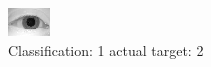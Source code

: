 \begin{figure}[h!]
\begin{center}
\includegraphics[width=0.60\columnwidth]{figures/ID860_class_1_target_2.png}
\end{center}
\caption{ Classification: 1 actual target: 2}
\label{fig:ID860_class_1_target_2}
\end{figure}
